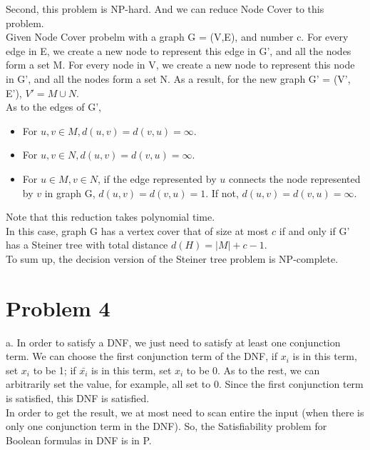 \documentclass[12pt]{article}
\begin{document}
Second, this problem is NP-hard. And we can reduce Node Cover to this
problem. \\

Given Node Cover probelm with a graph G = (V,E), and number c. For
every edge in E, we create a new node to represent this edge in G',
and all the nodes form a set M. For every node in V, we create a new
node to represent this node in G', and all the nodes form a set N. As
a result, for the new graph G' = (V', E'), $V' = M \cup N$. \\

As to the edges of G',

\begin{itemize}
\item For $u, v \in M, d(u, v) = d(v,u) = \infty$.
\item For $u, v \in N, d(u,v) = d(v,u) = \infty$.
\item For $u \in M, v \in N$, if the edge represented by $u$ connects
  the node represented by $v$ in graph G, $d(u, v) = d(v, u) = 1$. If
  not, $d(u,v) = d(v,u) = \infty$.
\end{itemize}

Note that this reduction takes polynomial time. \\

In this case, graph G has a vertex cover that of size at most $c$ if
and only if G' has a Steiner tree with total distance $d(H) = |M| + c
- 1$. \\

To sum up, the decision version of the Steiner tree problem is
NP-complete. \\

\section*{Problem 4}

a. In order to satisfy a DNF, we just need to satisfy at least one
conjunction term. We can choose the first conjunction term of the DNF,
if $x_i$ is in this term, set $x_i$ to be 1; if $\bar {x_i}$ is in
this term, set $x_i$ to be 0. As to the rest, we can arbitrarily set
the value, for example, all set to 0. Since the first conjunction term
is satisfied, this DNF is satisfied. \\

In order to get the result, we at most need to scan entire the input
(when there is only one conjunction term in the DNF). So, the
Satisfiability problem for Boolean formulas in DNF is in P. \\
\end{document}
